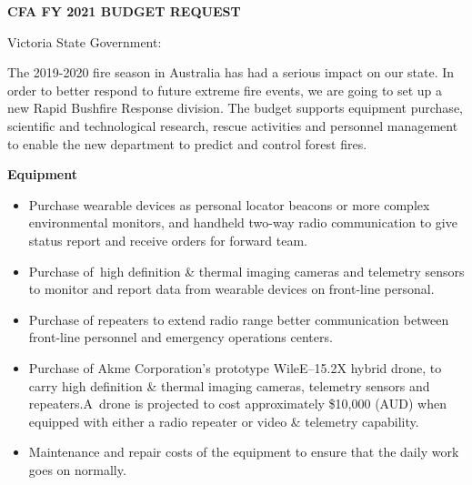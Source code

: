 \documentclass{mcmthesis}
\begin{document}
\newpage

\begin{center}
  \textbf{CFA FY 2021 BUDGET REQUEST}
\end{center}

Victoria State Government:

The 2019-2020 fire season in Australia has had a serious impact on our state. In order to better respond to future extreme fire events, we are going to set up a new Rapid Bushfire Response division. The budget supports equipment purchase, scientific and technological research, rescue activities and personnel management to enable the new department to predict and control forest fires. 

\textbf{Equipment}
\begin{itemize}
  \item Purchase wearable devices as personal locator beacons or more complex environmental monitors, and handheld two-way radio communication to give status report and receive orders for forward team.
  \item Purchase of high definition \& thermal imaging cameras and telemetry sensors to monitor and report data from wearable devices on front-line personal.
  \item Purchase of repeaters to extend radio range better communication between front-line personnel and emergency operations centers.
  \item Purchase of Akme Corporation's prototype WileE–15.2X hybrid drone, to carry high definition \& thermal imaging cameras, telemetry sensors and repeaters.A drone is projected to cost approximately \$10,000 (AUD) when equipped with either a radio repeater or video \& telemetry capability.
  \item Maintenance and repair costs of the equipment to ensure that the daily work goes on normally.
\end{itemize}
\end{document}
